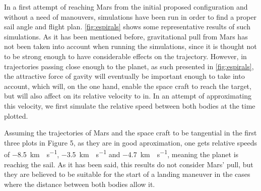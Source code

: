 \documentclass[twocolumn,12pt,a4paper]{article}
\numberwithin{equation}{section}
\begin{document}
In a first attempt of reaching Mars from the initial proposed configuration and without a need of manouvers, simulations have been run in order to find a proper sail angle and flight plan. \autoref{fig:espirals} shows some representative results of such simulations. As it has been mentioned before, gravitational pull from Mars has not been taken into account when running the simulations, since it is thought not to be strong enough to have considerable effects on the trajectory. However, in trajectories passing close enough to the planet, as such presented in \autoref{fig:espirals}, the attractive force of gavity will eventually be important enough to take into account, which will, on the one hand, enable the space craft to reach the target, but will also affect on its relative velocity to in. In an attempt of approximating this velocity, we first simulate the relative speed between both bodies at the time plotted.

Assuming the trajectories of Mars and the space craft to be tangential in the first three plots in Figure 5, as they are in good aproximation, one gets relative speeds of \SI{-8,5}{km\cdot s^{-1}}, \SI{-3.5}{km\cdot s^{-1}}  and \SI{-4.7}{km\cdot s^{-1}}, meaning the planet is reachisg the sail. As it has been said, this results do not consider Mars' pull,  but they are believed to be suitable for the start of a landing maneuver in the cases where the distance between both bodies allow it.
\end{document}

